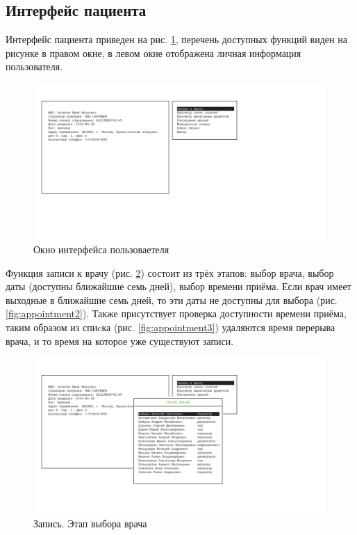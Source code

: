 \documentclass[14pt,a4paper,russian]{extreport}
\begin{document}
\subsection{Интерфейс пациента}
Интерфейс пациента приведен на рис. \ref{fig:patientint}, перечень доступных функций виден на рисунке в правом окне, в левом окне отображена личная информация пользователя.
\begin{figure}[h!]
        \includegraphics[width=\textwidth]{prog_int/patient-interface}
        \caption{Окно интерфейса пользоваетеля}
        \label{fig:patientint}
\end{figure}
Функция записи к врачу (рис. \ref{fig:appointment1}) состоит из трёх этапов: выбор врача, выбор даты (доступны ближайшие семь дней), выбор времени приёма.
Если врач имеет выходные в ближайшие семь дней, то эти даты не доступны для выбора (рис. \ref{fig:appointment2}). Также присутствует проверка доступности времени приёма, таким образом из спиcка (рис. \ref{fig:appointment3}) удаляются время перерыва врача, и то время на которое уже существуют записи.
\begin{figure}[h!]
        \includegraphics[width=\textwidth]{prog_int/appointment1}
        \caption{Запись. Этап выбора врача}
        \label{fig:appointment1}
\end{figure}
\end{document}
